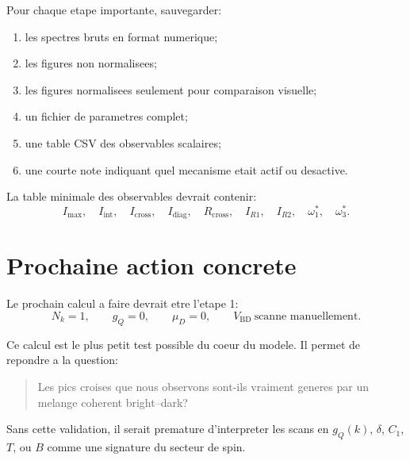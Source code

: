 \documentclass[11pt]{article}
\begin{document}
Pour chaque etape importante, sauvegarder:
\begin{enumerate}
    \item les spectres bruts en format numerique;
    \item les figures non normalisees;
    \item les figures normalisees seulement pour comparaison visuelle;
    \item un fichier de parametres complet;
    \item une table CSV des observables scalaires;
    \item une courte note indiquant quel mecanisme etait actif ou desactive.
\end{enumerate}

La table minimale des observables devrait contenir:
\begin{equation}
I_{\max},\quad
I_{\mathrm{int}},\quad
I_{\mathrm{cross}},\quad
I_{\mathrm{diag}},\quad
R_{\mathrm{cross}},\quad
I_{R1},\quad
I_{R2},\quad
\omega_1^\ast,\quad
\omega_3^\ast.
\end{equation}

\section{Prochaine action concrete}

Le prochain calcul a faire devrait etre l'etape 1:
\begin{equation}
N_k=1,\qquad
g_Q=0,\qquad
\mu_D=0,\qquad
V_{\mathrm{BD}}\ \text{scanne manuellement}.
\end{equation}

Ce calcul est le plus petit test possible du coeur du modele. Il permet de repondre a la question:
\begin{quote}
Les pics croises que nous observons sont-ils vraiment generes par un melange coherent bright--dark?
\end{quote}

Sans cette validation, il serait premature d'interpreter les scans en \(g_Q(k)\), \(\delta\), \(C_1\), \(T\), ou \(B\) comme une signature du secteur de spin.
\end{document}
